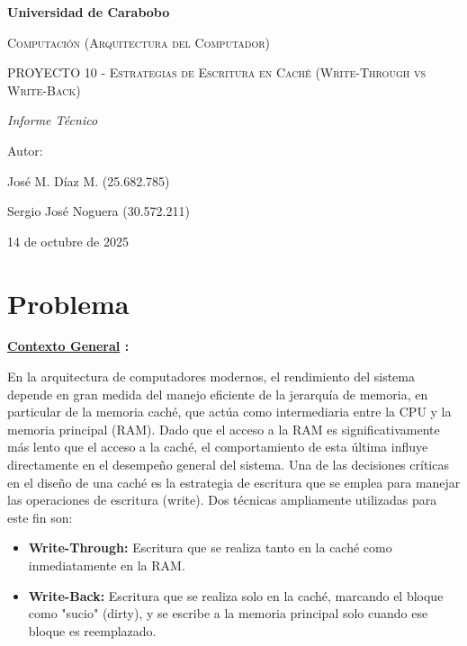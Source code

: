 \documentclass{article}
\begin{document}
\begin{titlepage}
        \centering
        {\bfseries\LARGE Universidad de Carabobo \par}
        \vspace{1cm}
        {\scshape\Large Computaci\'on (Arquitectura del Computador) \par}
        \vspace{3cm}
        {\scshape\Huge PROYECTO 10 - Estrategias de Escritura en Cach\'e (Write-Through vs Write-Back) \par}
        \vspace{3cm}
        {\itshape\Large Informe T\'ecnico \par}
        \vfill
        {\Large Autor: \par}
        {\Large José M. Díaz M. (25.682.785) \par}
        {\Large Sergio José Noguera (30.572.211) \par}
        \vfill
        {\Large 14 de octubre de 2025 \par}
\end{titlepage}


\section{Problema}

\quad

\textbf{ \underline{Contexto General} :}

\quad

{En la arquitectura de computadores modernos, el rendimiento del sistema depende en gran medida del manejo eficiente de la jerarquía de memoria, en particular de la memoria caché, que actúa como intermediaria entre la CPU y la memoria principal (RAM). Dado que el acceso a la RAM es significativamente más lento que el acceso a la caché, el comportamiento de esta última influye directamente en el desempeño general del sistema.
Una de las decisiones críticas en el diseño de una caché es la estrategia de escritura que se emplea para manejar las operaciones de escritura (write). Dos técnicas ampliamente utilizadas para este fin son:}

\quad


\begin{itemize}
    \item \textbf{Write-Through:} {Escritura que se realiza tanto en la caché como inmediatamente en la RAM.}
    \item \textbf{Write-Back:} {Escritura que se realiza solo en la caché, marcando el bloque como "sucio" (dirty), y se escribe a la memoria principal solo cuando ese bloque es reemplazado.}
\end{itemize}
\end{document}
